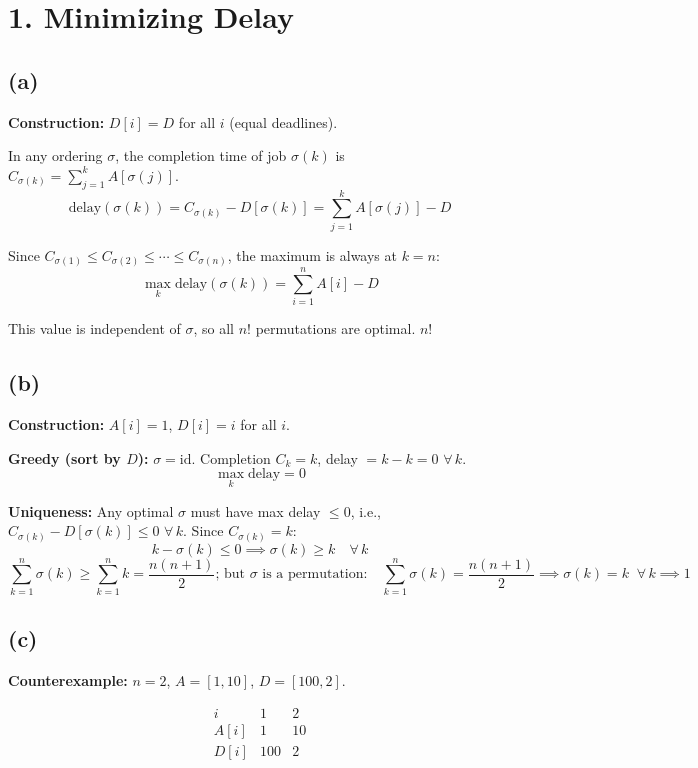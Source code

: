 \documentclass[11pt]{article}
\begin{document}
\section*{1. Minimizing Delay}

\subsection*{(a)}

\textbf{Construction:} $D[i] = D$ for all $i$ (equal deadlines).

In any ordering $\sigma$, the completion time of job $\sigma(k)$ is $C_{\sigma(k)} = \sum_{j=1}^{k} A[\sigma(j)]$.
\[
\text{delay}(\sigma(k)) = C_{\sigma(k)} - D[\sigma(k)] = \sum_{j=1}^{k} A[\sigma(j)] - D
\]

Since $C_{\sigma(1)} \le C_{\sigma(2)} \le \cdots \le C_{\sigma(n)}$, the maximum is always at $k = n$:
\[
\max_k \text{delay}(\sigma(k)) = \sum_{i=1}^{n} A[i] - D
\]

This value is independent of $\sigma$, so all $n!$ permutations are optimal. $\boxed{n!}$

\subsection*{(b)}

\textbf{Construction:} $A[i] = 1$, $D[i] = i$ for all $i$.

\textbf{Greedy (sort by $D$):} $\sigma = \mathrm{id}$. Completion $C_k = k$, delay $= k - k = 0$ $\forall\, k$.
\[
\max_k \text{delay} = 0
\]

\textbf{Uniqueness:} Any optimal $\sigma$ must have max delay $\le 0$, i.e., $C_{\sigma(k)} - D[\sigma(k)] \le 0$ $\forall\, k$. Since $C_{\sigma(k)} = k$:
\[
k - \sigma(k) \le 0 \implies \sigma(k) \ge k \quad \forall\, k
\]
\vspace{-5pt}
\[
\sum_{k=1}^{n} \sigma(k) \ge \sum_{k=1}^{n} k = \frac{n(n+1)}{2} 
\text{; but } \sigma \text{ is a permutation:} \quad \sum_{k=1}^{n} \sigma(k) = \frac{n(n+1)}{2} \implies \sigma(k) = k \;\; \forall\, k \implies \boxed{1}
\]

\subsection*{(c)}

\textbf{Counterexample:} $n = 2$, $A = [1, 10]$, $D = [100, 2]$.

\[
\begin{array}{c|cc}
i & 1 & 2 \\ \hline
A[i] & 1 & 10 \\
D[i] & 100 & 2
\end{array}
\]
\end{document}
